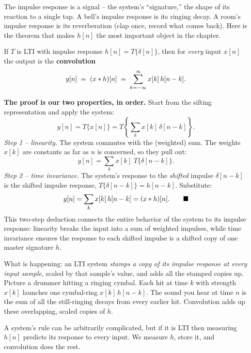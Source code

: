The impulse response is a signal -- the system's ``signature,'' the shape of its
reaction to a single tap. A bell's impulse response is its ringing decay. A
room's impulse response is its reverberation (clap once, record what comes back).
Here is the theorem that makes $h[n]$ the most important object in the chapter.

\begin{theorem}
\label{ch12:thm-conv}
If $T$ is LTI with impulse response $h[n] = T\{\delta[n]\}$, then for
\emph{every} input $x[n]$ the output is the \textbf{convolution}
\[
  y[n] \;=\; (x \ast h)[n] \;=\; \sum_{k=-\infty}^{\infty} x[k]\,h[n-k].
\]
\end{theorem}

\begin{whybox}
\textbf{The proof is our two properties, in order.} Start from the sifting
representation and apply the system:
\[
  y[n] = T\{x[n]\} = T\!\left\{ \sum_{k} x[k]\,\delta[n-k] \right\}.
\]
\emph{Step 1 -- linearity.} The system commutes with the (weighted) sum. The
weights $x[k]$ are constants as far as $n$ is concerned, so they pull out:
\[
  y[n] = \sum_{k} x[k]\; T\{\delta[n-k]\}.
\]
\emph{Step 2 -- time invariance.} The system's response to the \emph{shifted}
impulse $\delta[n-k]$ is the shifted impulse response,
$T\{\delta[n-k]\} = h[n-k]$. Substitute:
\[
  y[n] = \sum_{k} x[k]\,h[n-k] = (x\ast h)[n]. \qquad\blacksquare
\]
This two-step deduction connects the entire behavior of the system to its impulse response: linearity breaks the input into a sum of weighted impulses, while time invariance ensures the response to each shifted impulse is a shifted copy of one master signature $h$.
\end{whybox}

\begin{happeningbox}
What is happening: an LTI system \emph{stamps a copy of its impulse
response at every input sample}, scaled by that sample's value, and adds all the
stamped copies up. Picture a drummer hitting a ringing cymbal. Each hit at time
$k$ with strength $x[k]$ launches one cymbal-ring $x[k]\,h[n-k]$. The sound you
hear at time $n$ is the sum of all the still-ringing decays from every earlier
hit. Convolution adds up these overlapping, scaled copies of $h$.
\end{happeningbox}

A system's rule can be arbitrarily complicated, but if it is LTI then measuring $h[n]$ predicts its response to every input. We measure $h$, store it, and convolution does the rest.

